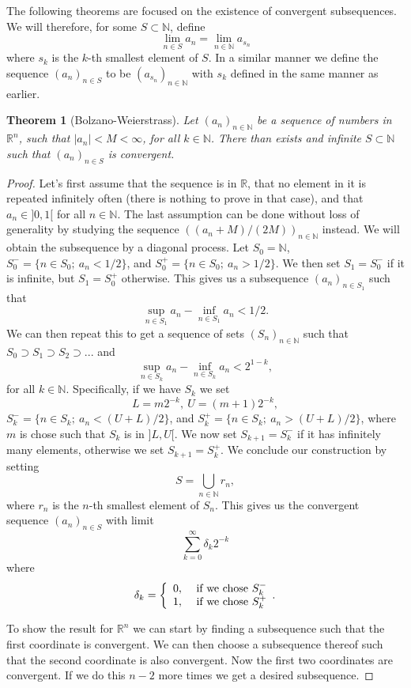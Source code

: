 \documentclass[a4paper,12pt,twoside,BCOR=10mm]{scrbook}
\newtheorem{theorem}{Theorem}[section]
\theoremstyle{definition}
\theoremstyle{definition}
\theoremstyle{definition}
\begin{document}
The following theorems are focused on the existence of convergent subsequences.
We will therefore, for some $S \subset \mathbb{N}$, define
\[
	\lim_{n \in S} a_n = \lim_{n \in \mathbb{N}} a_{s_n}
\]
where $s_k$ is the $k$-th smallest element of $S$.
In a similar manner we define the sequence $(a_n)_{n \in S}$ to be $(a_{s_n})_{n \in \mathbb{N}}$ with $s_k$ defined in the same manner as earlier.
\begin{theorem}[Bolzano-Weierstrass]
Let $(a_n)_{n \in \mathbb{N}}$ be a sequence of numbers in $\mathbb{R}^n$, such that $|a_n| < M < \infty$, for all $k \in \mathbb{N}$.
There than exists and infinite $S \subset \mathbb{N}$ such that $(a_n)_{n \in S}$ is convergent.
\end{theorem}
\begin{proof}
Let's first assume that the sequence is in $\mathbb{R}$,
	that no element in it is repeated infinitely often (there is nothing to prove in that case),
	and that $a_n \in ]0, 1[$ for all $n \in \mathbb{N}$.
The last assumption can be done without loss of generality by studying the sequence $((a_n + M)/(2M))_{n \in \mathbb{N}}$ instead.
We will obtain the subsequence by a diagonal process.
Let $S_0 = \mathbb{N}$, $S_0^- = \{n \in S_0;\ a_n < 1/2\}$, and $S_0^+ = \{n \in S_0;\ a_n > 1/2\}$.
We then set $S_1 = S_0^-$ if it is infinite, but $S_1 = S_0^+$ otherwise.
This gives us a subsequence $(a_n)_{n \in S_1}$ such that
\[
	\sup_{n \in S_1} a_n - \inf_{n \in S_1} a_n < 1/2.
\]
We can then repeat this to get a sequence of sets $(S_n)_{n \in \mathbb{N}}$ such that $S_0 \supset S_1 \supset S_2 \supset...$ and 
\[
	\sup_{n \in S_k} a_n - \inf_{n \in S_k} a_n < 2^{1 - k},
\]
for all $k \in \mathbb{N}$.
Specifically, if we have $S_k$ we set
\[
	L = m2^{-k},\ 
	U = (m + 1)2^{-k},
\]
$S_k^- = \{n \in S_k;\ a_n < (U + L)/2\}$, and $S_k^+ = \{n \in S_k;\ a_n > (U + L)/2\}$, where $m$ is chose such that $S_k$ is in $]L, U[$.
We now set $S_{k + 1} = S_k^-$ if it has infinitely many elements, otherwise we set $S_{k + 1} = S_k^+$.
We conclude our construction by setting
\[
	S = \bigcup_{n \in \mathbb{N}} r_n,
\]
where $r_n$ is the $n$-th smallest element of $S_n$.
This gives us the convergent sequence $(a_n)_{n \in S}$ with limit
\[
	\sum_{k = 0}^{\infty} \delta_k 2^{-k}
\]
where
\[
	\delta_k = \left \{
	\begin{array}{c c}
		0,\ & \text{if we chose } S_k^- \\
		1,\ & \text{if we chose } S_k^+
	\end{array}.
	\right .
\]

To show the result for $\mathbb{R}^n$ we can start by finding a subsequence such that the first coordinate is convergent.
We can then choose a subsequence thereof such that the second coordinate is also convergent.
Now the first two coordinates are convergent.
If we do this $n - 2$ more times we get a desired subsequence.
\end{proof}
\end{document}
